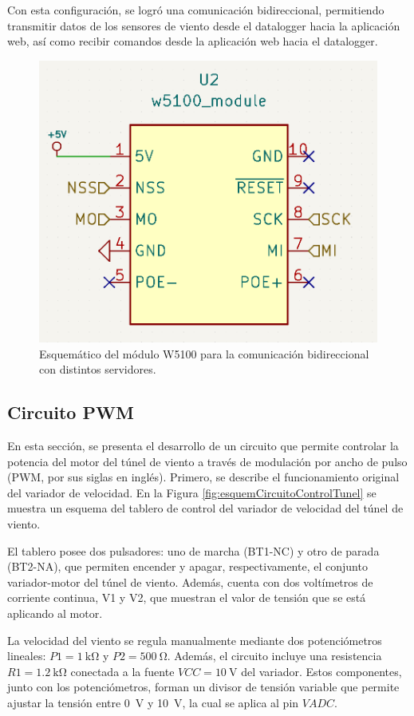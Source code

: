 Con esta configuración, se logró una comunicación bidireccional, permitiendo transmitir datos de los sensores de viento desde el datalogger hacia la aplicación web, así como recibir comandos desde la aplicación web hacia el datalogger.
\begin{figure}[H]
    \centering
    \includegraphics[width=0.5\linewidth]{Figuras/datalogger/Hardware/esquemEthernet.png}
    \caption{Esquemático del módulo W5100 para la comunicación bidireccional con distintos servidores.}
    \label{fig:esquemEthernet}
\end{figure}


\subsection{Circuito PWM}\label{sec:circuitoPWM}


En esta sección, se presenta el desarrollo de un circuito que permite controlar la potencia del motor del túnel de viento a través de modulación por ancho de pulso (PWM, por sus siglas en inglés). Primero, se describe el funcionamiento original del variador de velocidad. En la Figura \ref{fig:esquemCircuitoControlTunel} se muestra un esquema del tablero de control del variador de velocidad del túnel de viento.

El tablero posee dos pulsadores: uno de marcha (BT1-NC) y otro de parada (BT2-NA), que permiten encender y apagar, respectivamente, el conjunto variador-motor del túnel de viento. Además, cuenta con dos voltímetros de corriente continua, V1 y V2, que muestran el valor de tensión que se está aplicando al motor.

La velocidad del viento se regula manualmente mediante dos potenciómetros lineales: $P1 = \SI{1}{\kilo\ohm}$ y $P2 = \SI{500}{\ohm}$. Además, el circuito incluye una resistencia $R1 = \SI{1.2}{\kilo\ohm}$ conectada a la fuente $VCC = \SI{10}{\volt}$ del variador. Estos componentes, junto con los potenciómetros, forman un divisor de tensión variable que permite ajustar la tensión entre \SI{0}{\volt} y \SI{10}{\volt}, la cual se aplica al pin $VADC$.


